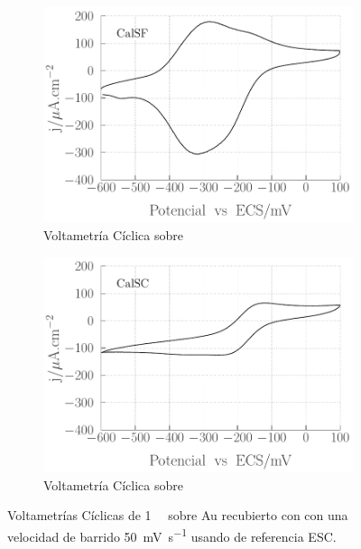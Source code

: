 						\begin{figure}[th]
				 	   	    \begin{subfigure}[t]{0.495\textwidth}
				        	\includegraphics[width=\textwidth]{Graficos/SF-accesibilidad.pdf}
				       		\caption{Voltametría Cíclica sobre \pdmF}
				         	\end{subfigure}
				         	\begin{subfigure}[t]{0.495\textwidth}
				        	\includegraphics[width=\textwidth]{Graficos/SC-accesibilidad.pdf}
				       		\caption{Voltametría Cíclica sobre \pdmC}
				         	\end{subfigure}
				     		\caption[Accesibilidad electrodo de trabajo.]{Voltametrías Cíclicas de \aminorutenio\space \SI{1}{\milli\Molar} sobre Au recubierto con \pdm con una velocidad de barrido \SI{50}{\milli\volt\per\second} usando de referencia ESC.}
				     		\label{fig:accesibilidad}
				     		\end{figure}

